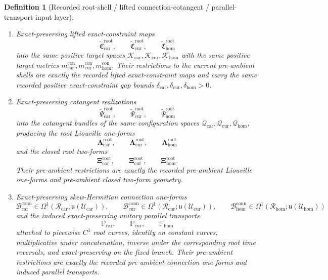 \documentclass[11pt]{article}
\newcommand{\RootTensorClass}{\mathscr U_{\mathrm{car}}}
\newcommand{\RootRelabelClass}{\mathscr U_{\mathrm{cur}}}
\newcommand{\RootFreeClass}{\mathscr U_{\mathrm{hom}}}
\newcommand{\TensorShellTarget}{\mathcal E_{\mathrm{car}}}
\newcommand{\CurShellTarget}{\mathcal E_{\mathrm{cur}}}
\newcommand{\HomShellTarget}{\mathcal E_{\mathrm{hom}}}
\newcommand{\TensorShellMetric}{m_{\mathrm{car}}^{\mathrm{sh}}}
\newcommand{\CurShellMetric}{m_{\mathrm{cur}}^{\mathrm{sh}}}
\newcommand{\HomShellMetric}{m_{\mathrm{hom}}^{\mathrm{sh}}}
\newcommand{\TensorShellGap}{\eta_{\mathrm{car}}}
\newcommand{\CurShellGap}{\eta_{\mathrm{cur}}}
\newcommand{\HomShellGap}{\eta_{\mathrm{hom}}}
\newcommand{\TensorConstraintTarget}{\mathcal K_{\mathrm{car}}}
\newcommand{\CurConstraintTarget}{\mathcal K_{\mathrm{cur}}}
\newcommand{\HomConstraintTarget}{\mathcal K_{\mathrm{hom}}}
\newcommand{\TensorConstraintMetric}{m_{\mathrm{car}}^{\mathrm{con}}}
\newcommand{\CurConstraintMetric}{m_{\mathrm{cur}}^{\mathrm{con}}}
\newcommand{\HomConstraintMetric}{m_{\mathrm{hom}}^{\mathrm{con}}}
\newcommand{\TensorConstraintGap}{\delta_{\mathrm{car}}}
\newcommand{\CurConstraintGap}{\delta_{\mathrm{cur}}}
\newcommand{\HomConstraintGap}{\delta_{\mathrm{hom}}}
\newcommand{\TensorConfigSpace}{\mathcal Q_{\mathrm{car}}}
\newcommand{\CurConfigSpace}{\mathcal Q_{\mathrm{cur}}}
\newcommand{\HomConfigSpace}{\mathcal Q_{\mathrm{hom}}}
\newcommand{\TensorRootSpace}{\mathcal R_{\mathrm{car}}}
\newcommand{\CurRootSpace}{\mathcal R_{\mathrm{cur}}}
\newcommand{\HomRootSpace}{\mathcal R_{\mathrm{hom}}}
\newcommand{\TensorRootLiftedShellSection}{\widetilde{\mathfrak D}_{\mathrm{car}}^{\mathrm{root}}}
\newcommand{\CurRootLiftedShellSection}{\widetilde{\mathfrak D}_{\mathrm{cur}}^{\mathrm{root}}}
\newcommand{\HomRootLiftedShellSection}{\widetilde{\mathfrak D}_{\mathrm{hom}}^{\mathrm{root}}}
\newcommand{\TensorRootConstraintMap}{\widetilde{\mathfrak C}_{\mathrm{car}}^{\mathrm{root}}}
\newcommand{\CurRootConstraintMap}{\widetilde{\mathfrak C}_{\mathrm{cur}}^{\mathrm{root}}}
\newcommand{\HomRootConstraintMap}{\widetilde{\mathfrak C}_{\mathrm{hom}}^{\mathrm{root}}}
\newcommand{\TensorRootCotangentRealization}{\widetilde{\Psi}_{\mathrm{car}}^{\mathrm{root}}}
\newcommand{\CurRootCotangentRealization}{\widetilde{\Psi}_{\mathrm{cur}}^{\mathrm{root}}}
\newcommand{\HomRootCotangentRealization}{\widetilde{\Psi}_{\mathrm{hom}}^{\mathrm{root}}}
\newcommand{\TensorRootLiouville}{\boldsymbol{\Lambda}_{\mathrm{car}}^{\mathrm{root}}}
\newcommand{\CurRootLiouville}{\boldsymbol{\Lambda}_{\mathrm{cur}}^{\mathrm{root}}}
\newcommand{\HomRootLiouville}{\boldsymbol{\Lambda}_{\mathrm{hom}}^{\mathrm{root}}}
\newcommand{\TensorRootTwo}{\boldsymbol{\Xi}_{\mathrm{car}}^{\mathrm{root}}}
\newcommand{\CurRootTwo}{\boldsymbol{\Xi}_{\mathrm{cur}}^{\mathrm{root}}}
\newcommand{\HomRootTwo}{\boldsymbol{\Xi}_{\mathrm{hom}}^{\mathrm{root}}}
\newcommand{\TensorRootConnectionForm}{\mathcal B_{\mathrm{car}}^{\mathrm{conn}}}
\newcommand{\CurRootConnectionForm}{\mathcal B_{\mathrm{cur}}^{\mathrm{conn}}}
\newcommand{\HomRootConnectionForm}{\mathcal B_{\mathrm{hom}}^{\mathrm{conn}}}
\newcommand{\TensorRootTransport}{\mathbb P_{\mathrm{car}}}
\newcommand{\CurRootTransport}{\mathbb P_{\mathrm{cur}}}
\newcommand{\HomRootTransport}{\mathbb P_{\mathrm{hom}}}
\newcommand{\LieU}{\mathfrak u}
\newtheorem{definition}{Definition}
\begin{document}
\begin{definition}[Recorded root-shell / lifted connection-cotangent / parallel-transport input layer]
\begin{enumerate}
    \[
    \TensorRootLiftedShellSection,\qquad
    \CurRootLiftedShellSection,\qquad
    \HomRootLiftedShellSection
    \]
    into the same positive shell target spaces \(\TensorShellTarget,\CurShellTarget,\HomShellTarget\) with the same positive shell target metrics \(\TensorShellMetric,\CurShellMetric,\HomShellMetric\). Their restrictions to the current pre-ambient exact-constraint shells are exactly the recorded lifted shell maps and carry the same recorded positive shell-gap bounds \(\TensorShellGap,\CurShellGap,\HomShellGap>0\) on the current seed shells.
    \item Exact-preserving lifted exact-constraint maps
    \[
    \TensorRootConstraintMap,\qquad
    \CurRootConstraintMap,\qquad
    \HomRootConstraintMap
    \]
    into the same positive target spaces \(\TensorConstraintTarget,\CurConstraintTarget,\HomConstraintTarget\) with the same positive target metrics \(\TensorConstraintMetric,\CurConstraintMetric,\HomConstraintMetric\). Their restrictions to the current pre-ambient shells are exactly the recorded lifted exact-constraint maps and carry the same recorded positive exact-constraint gap bounds \(\TensorConstraintGap,\CurConstraintGap,\HomConstraintGap>0\).
    \item Exact-preserving cotangent realizations
    \[
    \TensorRootCotangentRealization,\qquad
    \CurRootCotangentRealization,\qquad
    \HomRootCotangentRealization
    \]
    into the cotangent bundles of the same configuration spaces \(\TensorConfigSpace,\CurConfigSpace,\HomConfigSpace\), producing the root Liouville one-forms
    \[
    \TensorRootLiouville,\qquad
    \CurRootLiouville,\qquad
    \HomRootLiouville
    \]
    and the closed root two-forms
    \[
    \TensorRootTwo,\qquad
    \CurRootTwo,\qquad
    \HomRootTwo.
    \]
    Their pre-ambient restrictions are exactly the recorded pre-ambient Liouville one-forms and pre-ambient closed two-form geometry.
    \item Exact-preserving skew-Hermitian connection one-forms
    \[
    \TensorRootConnectionForm\in\Omega^1(\TensorRootSpace;\LieU(\RootTensorClass)),\qquad
    \CurRootConnectionForm\in\Omega^1(\CurRootSpace;\LieU(\RootRelabelClass)),\qquad
    \HomRootConnectionForm\in\Omega^1(\HomRootSpace;\LieU(\RootFreeClass))
    \]
    and the induced exact-preserving unitary parallel transports
    \[
    \TensorRootTransport,\qquad
    \CurRootTransport,\qquad
    \HomRootTransport
    \]
    attached to piecewise \(C^1\) root curves, identity on constant curves, multiplicative under concatenation, inverse under the corresponding root time reversals, and exact-preserving on the fixed branch. Their pre-ambient restrictions are exactly the recorded pre-ambient connection one-forms and induced parallel transports.

\end{enumerate}
\end{definition}
\end{document}
